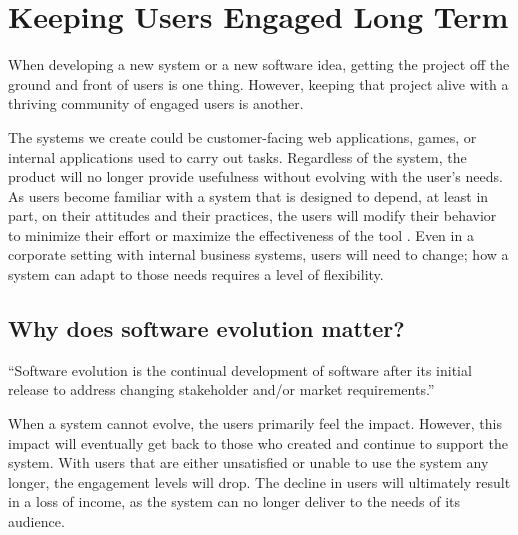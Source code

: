
\section{Keeping Users Engaged Long Term} \label{sectionTheProblem}


When developing a new system or a new software idea, getting the project off the ground and front of users is one thing. However, keeping that project alive with a thriving community of engaged users is another.

The systems we create could be customer-facing web applications, games, or internal applications used to carry out tasks. Regardless of the system, the product will no longer provide usefulness without evolving with the user's needs. As users become familiar with a system that is designed to depend, at least in part, on their attitudes and their practices, the users will modify their behavior to minimize their effort or maximize the effectiveness of the tool \cite{lehman:1980}. Even in a corporate setting with internal business systems, users will need to change; how a system can adapt to those needs requires a level of flexibility.

\subsection{Why does software evolution matter?} \label{subWhySoftwareEvolution}

\vspace{0.25cm}
\begin{displayquote}
  ``Software evolution is the continual development of software after its initial release to address changing stakeholder and/or market requirements.'' \cite{wiki:software-evolution}
\end{displayquote}
\vspace{0.25cm}

When a system cannot evolve, the users primarily feel the impact. However, this impact will eventually get back to those who created and continue to support the system. With users that are either unsatisfied or unable to use the system any longer, the engagement levels will drop. The decline in users will ultimately result in a loss of income, as the system can no longer deliver to the needs of its audience.

